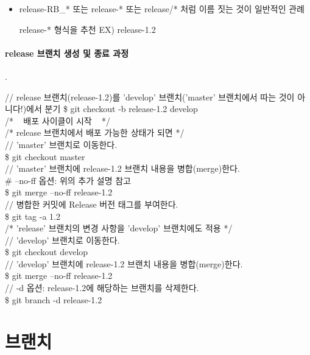 \documentclass[12pt, a4paper, oneside]{book}
\let\stdsection\section
\renewcommand\section{\newpage\stdsection}
\begin{document}
			\begin{itemize}
				\item release-RB\_* 또는 release-* 또는 release/* 처럼 이름 짓는 것이 일반적인 관례
				\item [release-* ] 형식을 추천 EX) release-1.2
			\end{itemize}
			
			
			\paragraph{release 브랜치 생성 및 종료 과정}
.\\
			
		\begin{tcolorbox}
			// release 브랜치(release-1.2)를 'develop' 브랜치('master' 브랜치에서 따는 것이 아니다!)에서 분기
			\$ git checkout -b release-1.2 develop \\
			/* ~ 배포 사이클이 시작 ~ */ \\
			/* release 브랜치에서 배포 가능한 상태가 되면 */  \\
			// 'master' 브랜치로 이동한다.  \\
			\$ git checkout master  \\
			// 'master' 브랜치에 release-1.2 브랜치 내용을 병합(merge)한다. \\
			\# --no-ff 옵션: 위의 추가 설명 참고 \\
			\$ git merge --no-ff release-1.2 \\
			// 병합한 커밋에 Release 버전 태그를 부여한다. \\
			\$ git tag -a 1.2 \\
			/* 'release' 브랜치의 변경 사항을 'develop' 브랜치에도 적용 */  \\
			// 'develop' 브랜치로 이동한다.  \\
			\$ git checkout develop  \\
			// 'develop' 브랜치에 release-1.2 브랜치 내용을 병합(merge)한다.  \\
			\$ git merge --no-ff release-1.2  \\
			// -d 옵션: release-1.2에 해당하는 브랜치를 삭제한다.  \\
			\$ git branch -d release-1.2  \\
		\end{tcolorbox}

			

	\section{브랜치}
\end{document}
